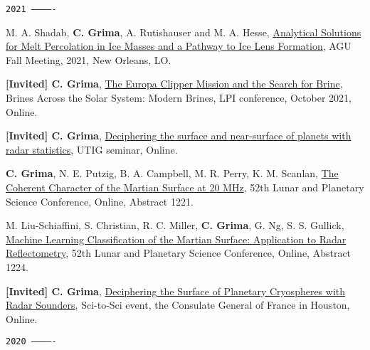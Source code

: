 \begin{etaremune}
\hspace{-2em}\texttt{2021 -------------}

\item
   M. A. Shadab, \textbf{C. Grima}, A. Rutishauser and M. A. Hesse, \href{https://agu.confex.com/agu/fm21/meetingapp.cgi/Paper/832820}{Analytical Solutions for Melt Percolation in Ice Masses and a Pathway to Ice Lens Formation}, AGU Fall Meeting, 2021, New Orleans, LO.
\item
   \textbf{{[}Invited{]} C. Grima}, \href{https://www.hou.usra.edu/meetings/modernbrines2021/pdf/modernbrines2021_program.htm}{The Europa Clipper Mission and the Search for Brine}, Brines Across the Solar System: Modern Brines, LPI conference, October 2021, Online.
\item
   \textbf{{[}Invited{]} C. Grima}, \href{https://twitter.com/UTGeophysics/status/1377991205414375424}{Deciphering the surface and near-surface of planets with radar statistics}, UTIG seminar, Online.
\item
  \textbf{C. Grima}, N. E. Putzig, B. A. Campbell, M. R. Perry, K. M. Scanlan, \href{https://www.hou.usra.edu/meetings/lpsc2021/pdf/1221.pdf}{The Coherent Character of the Martian Surface at 20 MHz}, 52th Lunar and Planetary Science Conference, Online, Abstract 1221.
\item
  M. Liu-Schiaffini, S. Christian, R. C. Miller, \textbf{C. Grima}, G. Ng, S. S. Gullick, \href{https://www.hou.usra.edu/meetings/lpsc2021/pdf/1224.pdf}{Machine Learning Classification of the Martian Surface: Application to Radar Reflectometry}, 52th Lunar and Planetary Science Conference, Online, Abstract 1224.
\item
  \textbf{{[}Invited{]} C. Grima}, \href{https://}{Deciphering the Surface of Planetary Cryospheres with Radar Sounders}, Sci-to-Sci event, the Consulate General of France in Houston, Online.

\hspace{-2em}\texttt{2020 -------------}


\end{etaremune}
